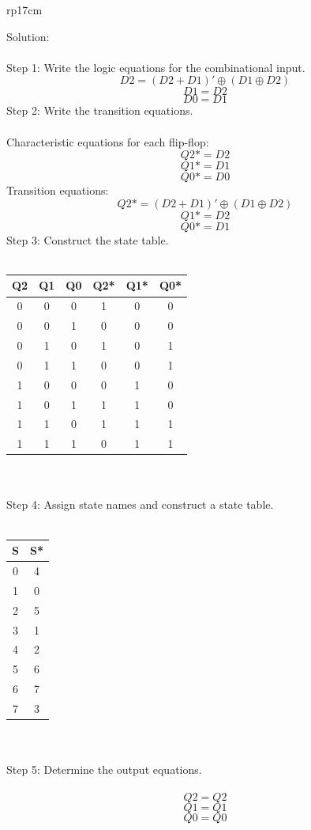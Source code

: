 \documentclass{article}
\begin{document}
\begin{longtable}[l]{rp{17cm}}
\begin{minipage}[t]{\linewidth}
Solution: \\ \\
Step 1: Write the logic equations for the combinational input.
$$D2 = (D2 + D1)' \oplus (D1 \oplus D2)$$
$$D1 = D2$$
$$D0 = D1$$
Step 2: Write the transition equations. \\ \\
Characteristic equations for each flip-flop:
$$Q2* = D2$$
$$Q1* = D1$$
$$Q0* = D0$$
Transition equations:
$$Q2* = (D2 + D1)' \oplus (D1 \oplus D2)$$
$$Q1* = D2$$
$$Q0* = D1$$
Step 3: Construct the state table. \\ \\
\begin{tabular}{ccc|ccc}
  \textbf{Q2} & \textbf{Q1} & \textbf{Q0} & \textbf{Q2*} & \textbf{Q1*} & \textbf{Q0*} \\
  \hline
  0 & 0 & 0 & 1 & 0 & 0 \\
  0 & 0 & 1 & 0 & 0 & 0 \\
  0 & 1 & 0 & 1 & 0 & 1 \\
  0 & 1 & 1 & 0 & 0 & 1 \\
  1 & 0 & 0 & 0 & 1 & 0 \\
  1 & 0 & 1 & 1 & 1 & 0 \\
  1 & 1 & 0 & 1 & 1 & 1 \\
  1 & 1 & 1 & 0 & 1 & 1 \\
\end{tabular} \\ \\
Step 4: Assign state names and construct a state table. \\ \\
\begin{tabular}{c|c}
  \textbf{S} & \textbf{S*} \\
  \hline
  0 & 4 \\
  1 & 0 \\
  2 & 5 \\
  3 & 1 \\
  4 & 2 \\
  5 & 6 \\
  6 & 7 \\
  7 & 3 \\
\end{tabular} \\ \\
Step 5: Determine the output equations. \\ \\
$$Q2 = Q2$$
$$Q1 = Q1$$
$$Q0 = Q0$$
\end{minipage}\\

\end{longtable}
\end{document}
